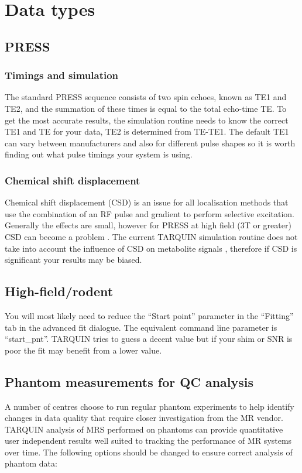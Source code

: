 \documentclass[a4paper,12pt]{article}
\begin{document}
\section{Data types}
\subsection{PRESS}
\subsubsection{Timings and simulation}
The standard PRESS sequence consists of two spin echoes, known as TE1 and TE2, and the summation of these times is equal to the total echo-time TE. To get the most accurate results, the simulation routine needs to know the correct TE1 and TE for your data, TE2 is determined from TE-TE1. The default TE1 can vary between manufacturers and also for different pulse shapes so it is worth finding out what pulse timings your system is using.

\subsubsection{Chemical shift displacement}
Chemical shift displacement (CSD) is an issue for all localisation methods that use the combination of an RF pulse and gradient to perform selective excitation. Generally the effects are small, however for PRESS at high field (3T or greater) CSD can become a problem \cite{CSD}. The current TARQUIN simulation routine does not take into account the influence of CSD on metabolite signals \cite{high_f_sims}, therefore if CSD is significant your results may be biased.

\subsection{High-field/rodent}
You will most likely need to reduce the ``Start point'' parameter in the ``Fitting'' tab in the advanced fit dialogue.  The equivalent command line parameter is ``start\_pnt''. TARQUIN tries to guess a decent value but if your shim or SNR is poor the fit may benefit from a lower value.

\subsection{Phantom measurements for QC analysis}
A number of centres choose to run regular phantom experiments to help identify changes in data quality that require closer investigation from the MR vendor. TARQUIN analysis of MRS performed on phantoms can provide quantitative user independent results well suited to tracking the performance of MR systems over time. The following options should be changed to ensure correct analysis of phantom data:
\end{document}
